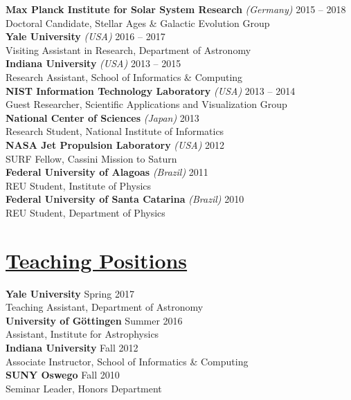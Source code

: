   \noindent\textbf{Max Planck Institute for Solar System Research} \emph{(Germany)} \hfill 2015 -- 2018\\
  Doctoral Candidate, Stellar Ages \& Galactic Evolution Group \vspace{1mm}\\
  \textbf{Yale University} \emph{(USA)} \hfill 2016 -- 2017\\
  Visiting Assistant in Research, Department of Astronomy\vspace{1mm}\\
  \textbf{Indiana University} \emph{(USA)} \hfill 2013 -- 2015\\
  Research Assistant, School of Informatics \& Computing \vspace{1mm}\\
  \textbf{NIST Information Technology Laboratory} \emph{(USA)} \hfill 2013 -- 2014\\
  Guest Researcher, Scientific Applications and Visualization Group \vspace{1mm}\\
  \textbf{National Center of Sciences} \emph{(Japan)} \hfill 2013\\
  Research Student, National Institute of Informatics \vspace{1mm}\\
  \textbf{NASA Jet Propulsion Laboratory} \emph{(USA)} \hfill  2012\\
  SURF Fellow, Cassini Mission to Saturn \vspace{1mm}\\
  \textbf{Federal University of Alagoas} \emph{(Brazil)} \hfill 2011\\
  REU Student, Institute of Physics\vspace{1mm}\\
  \textbf{Federal University of Santa Catarina} \emph{(Brazil)} \hfill 2010\\
  REU Student, Department of Physics
  
  \section*{\sc\underline{Teaching Positions}}
  \vspace*{-2mm}
  \textbf{Yale University} \hfill Spring 2017\\
  Teaching Assistant, Department of Astronomy\vspace{1mm}\\
  \textbf{University of G\"ottingen} \hfill Summer 2016\\
  Assistant, Institute for Astrophysics \vspace{1mm}\\
  \textbf{Indiana University} \hfill Fall 2012\\
  Associate Instructor, School of Informatics \& Computing\vspace{1mm}\\
  \textbf{SUNY Oswego} \hfill Fall 2010\\
  Seminar Leader, Honors Department
  
